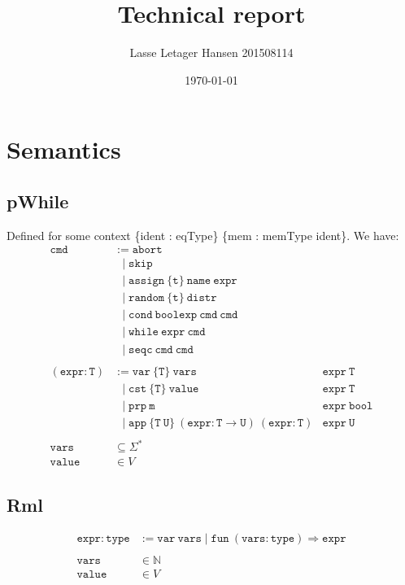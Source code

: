 \documentclass[11pt, leqno]{article}
\author{Lasse Letager Hansen 201508114}
\date{\today}
\title{Technical report}
\newcommand{\set}[1]{\{#1\}}
\begin{document}
\maketitle

\section{Semantics}
\subsection{pWhile}
Defined for some context \set{ident : eqType} \set{mem : memType ident}. We have:
\begin{align*}
  \mathtt{cmd} &:= \mathtt{abort} \\
               &~~\mid \mathtt{skip} \\
               &~~\mid \mathtt{assign~\set{t}~name~expr} \\
               &~~\mid \mathtt{random~\set{t}~distr} \\
               &~~\mid \mathtt{cond~boolexp~cmd~cmd} \\
               &~~\mid \mathtt{while~expr~cmd} \\
               &~~\mid \mathtt{seqc~cmd~cmd}
  \\ \\
  \mathtt{(expr : T)} &:= \mathtt{var~\set{T}~vars} & \mathtt{expr~T} \\
               &~~\mid \mathtt{cst~\set{T}~value} & \mathtt{expr~T} \\
               &~~\mid \mathtt{prp~m} & \mathtt{expr~bool} \\
               &~~\mid \mathtt{app~\set{T~U}~(expr : T \rightarrow U)~(expr : T)} & \mathtt{expr~U}
  \\ \\
  \mathtt{vars} &\subseteq \Sigma^* \\
  \mathtt{value} &\in V
\end{align*}

\subsection{Rml}
\begin{align*}
  \mathtt{expr : type} &:= \mathtt{var~vars} \mid \mathtt{fun~(vars : type) \Rightarrow expr}
  \\ \\
  \mathtt{vars} &\in \mathbb{N} \\
  \mathtt{value} &\in V
\end{align*}
\end{document}
